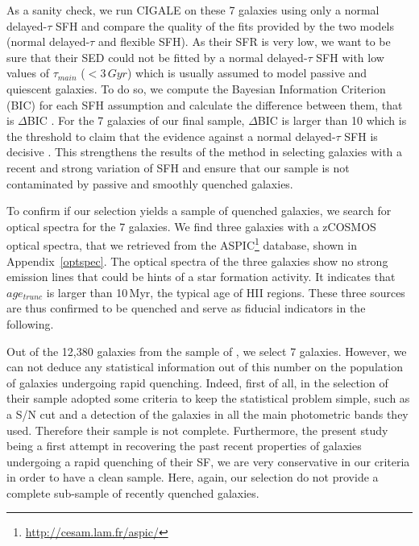 \documentclass[traditabstract]{aa} %
\begin{document}
As a sanity check, we run CIGALE on these 7 galaxies using only a normal delayed-$\tau$ SFH and compare the quality of the fits provided by the two models (normal delayed-$\tau$ and flexible SFH).
As their SFR is very low, we want to be sure that their SED could not be fitted by a normal delayed-$\tau$ SFH with low values of $\tau_{main}$ ($<3\,Gyr$) which is usually assumed to model passive and quiescent galaxies.
To do so, we compute the Bayesian Information Criterion (BIC) for each SFH assumption and calculate the difference between them, that is $\Delta$BIC \citep[see][for more details]{Ciesla18,Buat19,Aufort20}.
For the 7 galaxies of our final sample, $\Delta$BIC is larger than 10 which is the threshold to claim that the evidence against a normal delayed-$\tau$ SFH is decisive \citep[see, e.g., ][]{Robert07}.
This strengthens the results of the \cite{Aufort20} method in selecting galaxies with a recent and strong variation of SFH and ensure that our sample is not contaminated by passive and smoothly quenched galaxies.

To confirm if our selection yields a sample of quenched galaxies, we search for optical spectra for the 7 galaxies.
We find three galaxies with a zCOSMOS \citep{Lilly09} optical spectra, that we retrieved from the ASPIC\footnote{\url{http://cesam.lam.fr/aspic/}} database, shown in Appendix~\ref{optspec}.
The optical spectra of the three galaxies show no strong emission lines that could be hints of a star formation activity.
It indicates that $age_{trunc}$ is larger than 10\,Myr, the typical age of HII regions.
These three sources are thus confirmed to be quenched and serve as fiducial indicators in the following.

Out of the 12,380 galaxies from the sample of \cite{Aufort20}, we select 7 galaxies. 
However, we can not deduce any statistical information out of this number on the population of galaxies undergoing rapid quenching.
Indeed, first of all, in the selection of their sample  \cite{Aufort20} adopted some criteria to keep the statistical problem simple, such as a S/N cut and a detection of the galaxies in all the main photometric bands they used.
Therefore their sample is not complete.
Furthermore, the present study being a first attempt in recovering the past recent properties of galaxies undergoing a rapid quenching of their SF, we are very conservative in our criteria in order to have a clean sample. 
Here, again, our selection do not provide a complete sub-sample of recently quenched galaxies.
\end{document}
